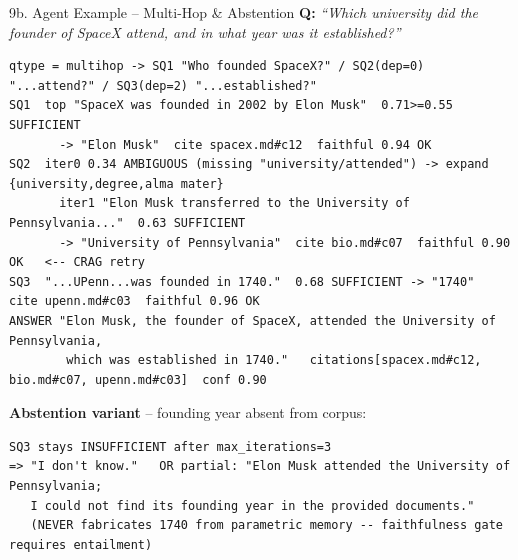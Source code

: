 \documentclass[10pt,aspectratio=169]{beamer}
\begin{document}
\begin{frame}[fragile]{9b. Agent Example -- Multi-Hop \& Abstention}
\textbf{Q:} \emph{``Which university did the founder of SpaceX attend, and in what year was it established?''}
\begin{lstlisting}[basicstyle=\ttfamily\tiny]
qtype = multihop -> SQ1 "Who founded SpaceX?" / SQ2(dep=0) "...attend?" / SQ3(dep=2) "...established?"
SQ1  top "SpaceX was founded in 2002 by Elon Musk"  0.71>=0.55 SUFFICIENT
       -> "Elon Musk"  cite spacex.md#c12  faithful 0.94 OK
SQ2  iter0 0.34 AMBIGUOUS (missing "university/attended") -> expand {university,degree,alma mater}
       iter1 "Elon Musk transferred to the University of Pennsylvania..."  0.63 SUFFICIENT
       -> "University of Pennsylvania"  cite bio.md#c07  faithful 0.90 OK   <-- CRAG retry
SQ3  "...UPenn...was founded in 1740."  0.68 SUFFICIENT -> "1740"  cite upenn.md#c03  faithful 0.96 OK
ANSWER "Elon Musk, the founder of SpaceX, attended the University of Pennsylvania,
        which was established in 1740."   citations[spacex.md#c12, bio.md#c07, upenn.md#c03]  conf 0.90
\end{lstlisting}

\textbf{Abstention variant} -- founding year absent from corpus:
\begin{lstlisting}[basicstyle=\ttfamily\tiny]
SQ3 stays INSUFFICIENT after max_iterations=3
=> "I don't know."   OR partial: "Elon Musk attended the University of Pennsylvania;
   I could not find its founding year in the provided documents."
   (NEVER fabricates 1740 from parametric memory -- faithfulness gate requires entailment)
\end{lstlisting}
\end{frame}
\end{document}
